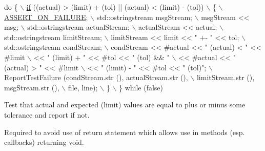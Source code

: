 \begin{DoxyCode}
\textcolor{keywordflow}{do} \{                                                                  \hyperlink{loss__ITU1238_8m_a419d895abe1313c35fa353c93802647e}{\(\backslash\)}
\hyperlink{loss__ITU1238_8m_a419d895abe1313c35fa353c93802647e}{    if} ((actual) > (limit) + (tol) || (actual) < (limit) - (tol))       \(\backslash\)
      \{                                                                 \hyperlink{group__testing_ga044d7c8c214fe3761af96ee3cbe2edc3}{\(\backslash\)}
\hyperlink{group__testing_ga044d7c8c214fe3761af96ee3cbe2edc3}{        ASSERT\_ON\_FAILURE};                                              \(\backslash\)
        std::ostringstream msgStream;                                   \(\backslash\)
        msgStream << msg;                                               \(\backslash\)
        std::ostringstream actualStream;                                \(\backslash\)
        actualStream << actual;                                         \(\backslash\)
        std::ostringstream limitStream;                                 \(\backslash\)
        limitStream << limit << \textcolor{stringliteral}{" +- "} << tol;                          \(\backslash\)
        std::ostringstream condStream;                                  \(\backslash\)
        condStream << #actual << \textcolor{stringliteral}{" (actual) < "} << #limit               \(\backslash\)
                   << \textcolor{stringliteral}{" (limit) + "} << #tol << \textcolor{stringliteral}{" (tol) && "}             \(\backslash\)
                   << #actual << \textcolor{stringliteral}{" (actual) > "} << #limit               \(\backslash\)
                   << \textcolor{stringliteral}{" (limit) - "} << #tol << \textcolor{stringliteral}{" (tol)"};                \(\backslash\)
        ReportTestFailure (condStream.str (), actualStream.str (),      \(\backslash\)
                       limitStream.str (), msgStream.str (),            \(\backslash\)
                       file, line);                                     \(\backslash\)
      \}                                                                 \(\backslash\)
  \} \textcolor{keywordflow}{while} (\textcolor{keyword}{false})
\end{DoxyCode}


Test that actual and expected (limit) values are equal to plus or minus some tolerance and report if not. 

Required to avoid use of return statement which allows use in methods (esp. callbacks) returning void. 
